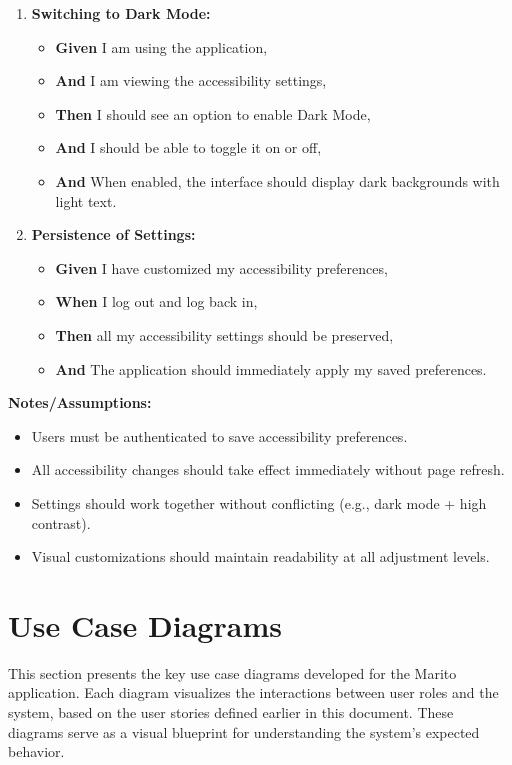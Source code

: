 \documentclass[12pt]{article}
\begin{document}
\begin{enumerate}
    \item \textbf{Switching to Dark Mode:}
    \begin{itemize}
        \item \textbf{Given} I am using the application,
        \item \textbf{And} I am viewing the accessibility settings,
        \item \textbf{Then} I should see an option to enable Dark Mode,
        \item \textbf{And} I should be able to toggle it on or off,
        \item \textbf{And} When enabled, the interface should display dark backgrounds with light text.
    \end{itemize}

    \item \textbf{Persistence of Settings:}
    \begin{itemize}
        \item \textbf{Given} I have customized my accessibility preferences,
        \item \textbf{When} I log out and log back in,
        \item \textbf{Then} all my accessibility settings should be preserved,
        \item \textbf{And} The application should immediately apply my saved preferences.
    \end{itemize}
\end{enumerate}

\vspace{1em}
\textbf{Notes/Assumptions:}
\begin{itemize}
    \item Users must be authenticated to save accessibility preferences.
    \item All accessibility changes should take effect immediately without page refresh.
    \item Settings should work together without conflicting (e.g., dark mode + high contrast).
    \item Visual customizations should maintain readability at all adjustment levels.
\end{itemize}


\section{Use Case Diagrams}

This section presents the key use case diagrams developed for the Marito application. Each diagram visualizes the interactions between user roles and the system, based on the user stories defined earlier in this document. These diagrams serve as a visual blueprint for understanding the system's expected behavior.
\end{document}
